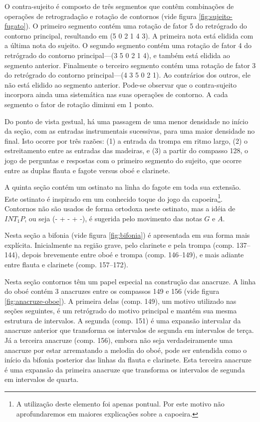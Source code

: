 O contra-sujeito é composto de três segmentos que contêm combinações
de operações de retrogradação e rotação de contornos (vide figura
\ref{fig:sujeito-fugato}). O primeiro segmento contém uma rotação de
fator 5 do retrógrado do contorno principal, resultando em (5 0 2 1 4
3). A primeira nota está elidida com a última nota do sujeito. O
segundo segmento contém uma rotação de fator 4 do retrógrado do
contorno principal---(3 5 0 2 1 4), e também está elidida ao segmento
anterior. Finalmente o terceiro segmento contém uma rotação de fator 3
do retrógrado do contorno principal---(4 3 5 0 2 1). Ao contrários dos
outros, ele não está elidido ao segmento anterior. Pode-se observar
que o contra-sujeito incorpora ainda uma sistemática nas suas
operações de contorno. A cada segmento o fator de rotação diminui em 1
ponto.

Do ponto de vista gestual, há uma passagem de uma menor densidade no
início da seção, com as entradas instrumentais sucessivas, para uma
maior densidade no final. Isto ocorre por três razões: (1) a entrada
da trompa em ritmo largo, (2) o estreitamento entre as entradas das
madeiras, e (3) a partir do compasso 128, o jogo de perguntas e
respostas com o primeiro segmento do sujeito, que ocorre entre as
duplas flauta e fagote versus oboé e clarinete.

A quinta seção contém um ostinato na linha do fagote em toda sua
extensão. Este ostinato é inspirado em um conhecido toque do jogo da
capoeira\footnote{A utilização deste elemento foi apenas pontual. Por
  este motivo não aprofundaremos em maiores explicações sobre a
  capoeira.}. Contornos não são usados de forma ortodoxa neste
ostinato, mas a idéia de $INT_1P$, ou seja (- + - + -), é sugerida
pelo movimento das notas $G$ e $A$.

Nesta seção a bifonia (vide figura \ref{fig:bifonia}) é apresentada em
sua forma mais explícita. Inicialmente na região grave, pelo clarinete
e pela trompa (comp. 137--144), depois brevemente entre oboé e trompa
(comp. 146--149), e mais adiante entre flauta e clarinete
(comp. 157--172).

Nesta seção contornos têm um papel especial na construção das
anacruze. A linha do oboé contém 3 anacruzes entre os compassos 149 e
156 (vide figura \ref{fig:anacruze-oboe}). A primeira delas
(comp. 149), um motivo utilizado nas seções seguintes, é um retrógrado
do motivo principal e mantém sua mesma estrutura de intervalos. A
segunda (comp. 151) é uma expansão intervalar da anacruze anterior que
transforma os intervalos de segunda em intervalos de terça. Já a
terceira anacruze (comp. 156), embora não seja verdadeiramente uma
anacruze por estar arrematando a melodia do oboé, pode ser entendida
como o início da bifonia posterior das linhas da flauta e
clarinete. Esta terceira anacruze é uma expansão da primeira anacruze
que transforma os intervalos de segunda em intervalos de quarta.

